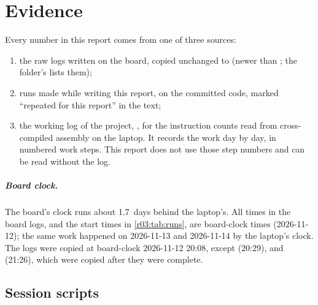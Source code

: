 \chapter{Evidence}\label{r03:app:evidence}

Every number in this report comes from one of three sources:
\begin{enumerate}
  \item the raw logs written on the board, copied unchanged to 
        (newer than \rcommitws; the folder's  lists them);
  \item runs made while writing this report, on the committed code, marked ``repeated for this
        report'' in the text;
  \item the working log of the project, ,
        for the instruction counts read from cross-compiled assembly on the laptop. It records
        the work day by day, in numbered work steps. This report does not use those step numbers
        and can be read without the log.
\end{enumerate}

\paragraph{Board clock.} The board's clock runs about 1.7~days behind the laptop's. All times in
the board logs, and the start times in \cref{r03:tab:runs}, are board-clock times (2026-11-12);
the same work happened on 2026-11-13 and 2026-11-14 by the laptop's clock. The logs were copied
at board-clock 2026-11-12 20:08, except  (20:29),
 and  (21:26), which were copied after they
were complete.

\section*{Session scripts}

